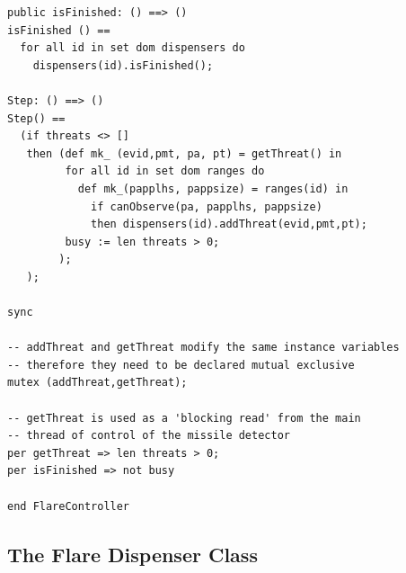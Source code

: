 \documentclass{overturerepchap}
\begin{document}
\begin{lstlisting}
public isFinished: () ==> ()
isFinished () ==
  for all id in set dom dispensers do
    dispensers(id).isFinished();

Step: () ==> ()
Step() ==
  (if threats <> []
   then (def mk_ (evid,pmt, pa, pt) = getThreat() in
         for all id in set dom ranges do
           def mk_(papplhs, pappsize) = ranges(id) in
             if canObserve(pa, papplhs, pappsize)
             then dispensers(id).addThreat(evid,pmt,pt);
         busy := len threats > 0; 
        );
   );

sync

-- addThreat and getThreat modify the same instance variables
-- therefore they need to be declared mutual exclusive
mutex (addThreat,getThreat);

-- getThreat is used as a 'blocking read' from the main
-- thread of control of the missile detector
per getThreat => len threats > 0;
per isFinished => not busy

end FlareController
\end{lstlisting}

\subsection{The Flare Dispenser Class}
\end{document}
